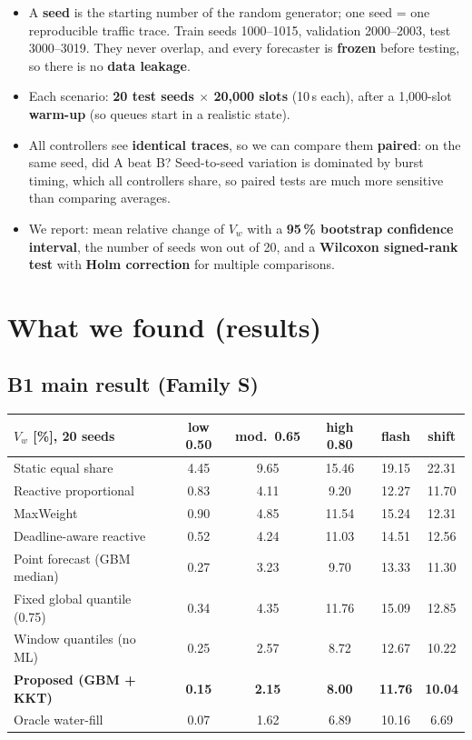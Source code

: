 \documentclass[11pt,a4paper]{article}
\begin{document}
\begin{itemize}
  \item A \textbf{seed} is the starting number of the random generator; one seed = one reproducible traffic trace. Train seeds 1000--1015, validation 2000--2003, test 3000--3019. They never overlap, and every forecaster is \textbf{frozen} before testing, so there is no \textbf{data leakage}.
  \item Each scenario: \textbf{20 test seeds $\times$ 20{,}000 slots} (10\,s each), after a 1{,}000-slot \textbf{warm-up} (so queues start in a realistic state).
  \item All controllers see \textbf{identical traces}, so we can compare them \textbf{paired}: on the same seed, did A beat B? Seed-to-seed variation is dominated by burst timing, which all controllers share, so paired tests are much more sensitive than comparing averages.
  \item We report: mean relative change of $V_w$ with a \textbf{95\,\% bootstrap confidence interval}, the number of seeds won out of 20, and a \textbf{Wilcoxon signed-rank test} with \textbf{Holm correction} for multiple comparisons.
\end{itemize}

\section{What we found (results)}

\subsection{B1 main result (Family S)}

\begin{center}
\small
\begin{tabular}{lccccc}
\toprule
$V_w$ [\%], 20 seeds & low 0.50 & mod.\ 0.65 & high 0.80 & flash & shift \\
\midrule
Static equal share & 4.45 & 9.65 & 15.46 & 19.15 & 22.31 \\
Reactive proportional & 0.83 & 4.11 & 9.20 & 12.27 & 11.70 \\
MaxWeight & 0.90 & 4.85 & 11.54 & 15.24 & 12.31 \\
Deadline-aware reactive & 0.52 & 4.24 & 11.03 & 14.51 & 12.56 \\
Point forecast (GBM median) & 0.27 & 3.23 & 9.70 & 13.33 & 11.30 \\
Fixed global quantile (0.75) & 0.34 & 4.35 & 11.76 & 15.09 & 12.85 \\
Window quantiles (no ML) & 0.25 & 2.57 & 8.72 & 12.67 & 10.22 \\
\rowcolor{good!12}\textbf{Proposed (GBM + KKT)} & \textbf{0.15} & \textbf{2.15} & \textbf{8.00} & \textbf{11.76} & \textbf{10.04} \\
\color{gray}Oracle water-fill & \color{gray}0.07 & \color{gray}1.62 & \color{gray}6.89 & \color{gray}10.16 & \color{gray}6.69 \\
\bottomrule
\end{tabular}
\end{center}
\end{document}
